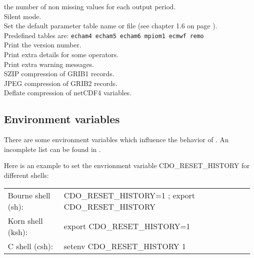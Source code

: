 \begin{tabbing}
         \> the number of non missing values for each output period. \\
         \> Silent mode. \\
         \> Set the default parameter table name or file (see chapter 1.6 on page \pageref{PARAMETER_TABLE}).\\
         \> Predefined tables are:  {\tt echam4 echam5 echam6 mpiom1 ecmwf remo}\\
         \> Print the version number. \\
         \> Print extra details for some operators. \\
         \> Print extra warning messages. \\
         \> SZIP compression of GRIB1 records. \\
         \> JPEG compression of GRIB2 records. \\
         \> Deflate compression of netCDF4 variables. \\
\end{tabbing}

\subsection{Environment variables}

There are some environment variables which influence the behavior of {\CDO}. 
An incomplete list can be found in .

Here is an example to set the envrionment variable CDO\_RESET\_HISTORY for different shells:

\begin{tabular}[b]{ll}
Bourne shell (sh): & CDO\_RESET\_HISTORY=1 ; export CDO\_RESET\_HISTORY \\
Korn shell (ksh):   & export CDO\_RESET\_HISTORY=1 \\
C shell (csh):        & setenv CDO\_RESET\_HISTORY 1 \\
\end{tabular}



